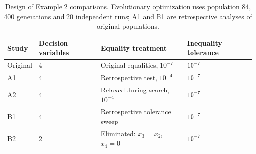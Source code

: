 \begin{table}[htbp]
\centering
\small
\caption{Design of Example 2 comparisons. Evolutionary optimization uses population 84, 400 generations and 20 independent runs; A1 and B1 are retrospective analyses of original populations.}
\label{tab:example2_design}
\begin{tabular}{llll}
\hline
Study & Decision variables & Equality treatment & Inequality tolerance \\
\hline
Original & 4 & Original equalities, $10^{-7}$ & $10^{-7}$ \\
A1 & 4 & Retrospective test, $10^{-4}$ & $10^{-7}$ \\
A2 & 4 & Relaxed during search, $10^{-4}$ & $10^{-7}$ \\
B1 & 4 & Retrospective tolerance sweep & $10^{-7}$ \\
B2 & 2 & Eliminated: $x_3=x_2$, $x_4=0$ & $10^{-7}$ \\
\hline
\end{tabular}
\end{table}
